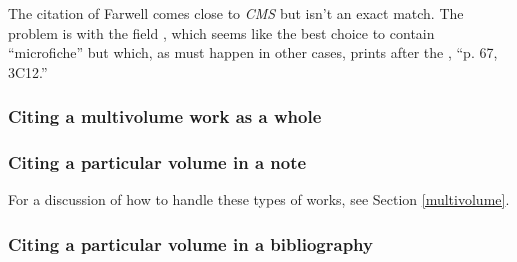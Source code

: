 \documentclass[11pt,letterpaper,oneside]{article}
\begin{document}
The citation of Farwell comes close to \textit{CMS} but isn't an exact
match. The problem is with the field , which
seems like the best choice to contain ``microfiche'' but which, as
must happen in other cases, prints after the , ``p.
67, 3C12.''

\begin{citebib}
\item \cite[p. 67, 3C12]{farwell1997}
\item \cite{tauber1958}
\end{citebib}

\setcounter{subsubsection}{116}
\subsubsection{Citing a multivolume work as a whole}
\label{14.117}

\begin{citebib}
\item \cite{aristotle1983}
\item \cite{byrne1981}
\item \cite{james1962}
\end{citebib}

\subsubsection{Citing a particular volume in a note}
\label{14.118}

For a discussion of how to handle these types of works, see Section
\ref{multivolume}.

\begin{citebib}
\item \cite[4:243]{byrne1981}
\item \cite*[32--33]{james1963.5}
\item \cite[4:245]{byrne1981}
\item \cite*[34]{james1963.5}
\end{citebib}

\subsubsection{Citing a particular volume in a bibliography}
\label{14.119}

\begin{citebib}
\item \cite{armstrong2014}
\end{citebib}
\end{document}
